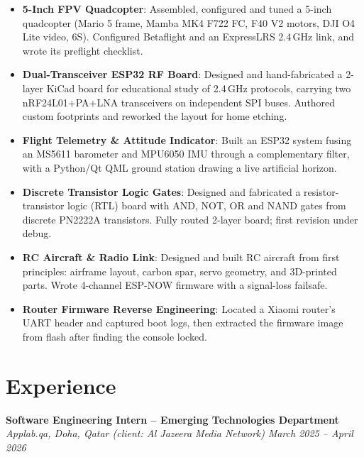 \documentclass[10pt,a4paper]{article}
\begin{document}
\begin{itemize}
    \item \textbf{5-Inch FPV Quadcopter}: Assembled, configured and tuned a
    5-inch quadcopter (Mario 5 frame, Mamba MK4 F722 FC, F40 V2 motors, DJI O4
    Lite video, 6S). Configured Betaflight and an ExpressLRS 2.4\,GHz link, and
    wrote its preflight checklist.

    \item \textbf{Dual-Transceiver ESP32 RF Board}: Designed and hand-fabricated
    a 2-layer KiCad board for educational study of 2.4\,GHz protocols, carrying
    two nRF24L01+PA+LNA transceivers on independent SPI buses. Authored custom
    footprints and reworked the layout for home etching.

    \item \textbf{Flight Telemetry \& Attitude Indicator}: Built an ESP32 system
    fusing an MS5611 barometer and MPU6050 IMU through a complementary filter,
    with a Python/Qt QML ground station drawing a live artificial horizon.

    \item \textbf{Discrete Transistor Logic Gates}: Designed and fabricated a
    resistor-transistor logic (RTL) board with AND, NOT, OR and NAND gates from
    discrete PN2222A transistors. Fully routed 2-layer board; first revision
    under debug.

    \item \textbf{RC Aircraft \& Radio Link}: Designed and built RC aircraft from
    first principles: airframe layout, carbon spar, servo geometry, and
    3D-printed parts. Wrote 4-channel ESP-NOW firmware with a signal-loss
    failsafe.

    \item \textbf{Router Firmware Reverse Engineering}: Located a Xiaomi router's
    UART header and captured boot logs, then extracted the firmware image from
    flash after finding the console locked.
\end{itemize}

\section*{Experience}
\textbf{Software Engineering Intern -- Emerging Technologies Department}\\
\textit{Applab.qa, Doha, Qatar (client: Al Jazeera Media Network)} \hfill \textit{March 2025 -- April 2026}
\end{document}
